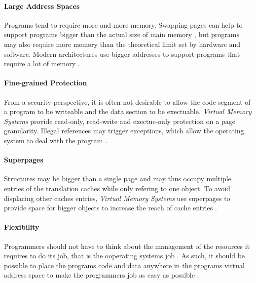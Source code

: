 
\paragraph{Large Address Spaces} Programs tend to require more and more memory. Swapping pages can help
to support programs bigger than the actual size of main memory \cite{tanenbaumOS}, but programs may
also require more memory than the theoretical limit set by hardware and software. Modern architectures
use bigger addresses to support programs that require a lot of memory \cite{jacobSoftwaremanagedAddressTranslation1997, jacobVirtualMemoryContemporary1998}.


\paragraph{Fine-grained Protection} From a security perspective, it is often not desirable to allow the code segment
of a program to be writeable and the data section to be exectuable. \textit{Virtual Memory Systems} provide read-only,
read-write and exectue-only protection on a page granularity\cite{jacobSoftwaremanagedAddressTranslation1997}.
Illegal references may trigger exceptions, which allow the operating system to deal with the program \cite{jacobVirtualMemoryContemporary1998}.


\paragraph{Superpages}
Structures may be bigger than a single page and may thus occupy multiple entries of the translation caches while
only refering to one object. To avoid displacing other caches entries, \textit{Virtual Memory Systems} use
superpages to provide space for bigger objects to increase the reach of cache entries \cite{jacobSoftwaremanagedAddressTranslation1997}.


\paragraph{Flexibility} Programmers should not have to think about the management
of the resources it requires to do its job, that is the ooperating systems job
\cite{tanenbaumOS}. As such, it should be possible to place the programs code
and data anywhere in the programs virtual address space to make the programmers
job as easy as possible
\cite{jacob1998virtualissues}. %

